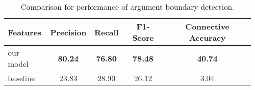 \begin{table}[ht]
\centering
\begin{tabular}{|l|c|c|c|c|}
\hline

    Features        &     Precision &     Recall &     F1-Score &     Connective Accuracy \\ \hline
    our model       & \bf 80.24     & \bf 76.80  & \bf 78.48    & \bf 40.74               \\ \hline
    baseline        &     23.83     &     28.90  &     26.12    &      3.04               \\ \hline

\end{tabular}
\caption{\label{t:argument-baseline} Comparison for performance of argument boundary detection. }
\end{table}
